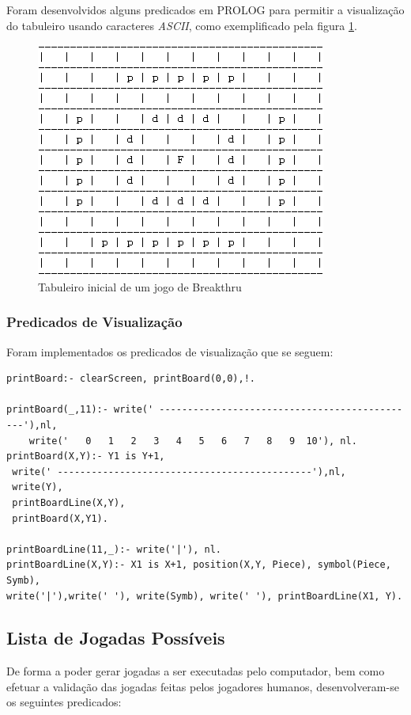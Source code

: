 \documentclass[a4paper]{article}
\begin{document}
Foram desenvolvidos alguns predicados em PROLOG para permitir a visualização do tabuleiro usando caracteres \textit{ASCII}, como exemplificado pela figura \ref{fig:example}.
\begin{figure}
\centering
\includegraphics[scale=1]{Breakthru_initial_sicstus.png}
\caption{Tabuleiro inicial de um jogo de Breakthru}
\label{fig:example}
\end{figure}

\subsubsection{Predicados de Visualização}
Foram implementados os predicados de visualização que se seguem:

\begin{verbatim}
printBoard:- clearScreen, printBoard(0,0),!.

printBoard(_,11):- write(' ----------------------------------------------'),nl,
	write('   0   1   2   3   4   5   6   7   8   9  10'), nl.
printBoard(X,Y):- Y1 is Y+1,
 write(' ---------------------------------------------'),nl,
 write(Y),
 printBoardLine(X,Y),
 printBoard(X,Y1).

printBoardLine(11,_):- write('|'), nl.
printBoardLine(X,Y):- X1 is X+1, position(X,Y, Piece), symbol(Piece, Symb),
write('|'),write(' '), write(Symb), write(' '), printBoardLine(X1, Y).
\end{verbatim}

\subsection{Lista de Jogadas Possíveis}
De forma a poder gerar jogadas a ser executadas pelo computador, bem como efetuar a validação das jogadas feitas pelos jogadores humanos, desenvolveram-se os seguintes predicados:
\end{document}
